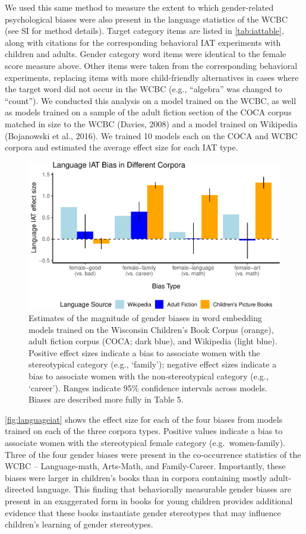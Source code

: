 \documentclass[english,,man,floatsintext]{apa6}
\begin{document}
We used this same method to measure the extent to which gender-related psychological biases were also present in the language statistics of the WCBC (see SI for method details). Target category items are listed in \autoref{tab:iattable}, along with citations for the corresponding behavioral IAT experiments with children and adults. Gender category word items were identical to the female score measure above. Other items were taken from the corresponding behavioral experiments, replacing items with more child-friendly alternatives in cases where the target word did not occur in the WCBC (e.g., \enquote{algebra} was changed to \enquote{count}). We conducted this analysis on a model trained on the WCBC, as well as models trained on a sample of the adult fiction section of the COCA corpus matched in size to the WCBC (Davies, 2008) and a model trained on Wikipedia (Bojanowski et al., 2016). We trained 10 models each on the COCA and WCBC corpora and estimated the average effect size for each IAT type.

\begin{figure}[t!]
\includegraphics[width=\textwidth,]{kidbookgender_files/figure-latex/languageiat-1} \caption{Estimates of the magnitude of gender biases in word embedding models trained on the Wisconsin Children’s Book Corpus (orange), adult fiction corpus (COCA; dark blue), and Wikipedia (light blue). Positive effect sizes indicate a bias to associate women with the stereotypical category (e.g., ‘family'); negative effect sizes indicate a bias to associate women with the non-stereotypical category (e.g., ‘career’).  Ranges indicate 95\% confidence intervals across models. Biases are described more fully in Table 5.}\label{fig:languageiat}
\end{figure}

\autoref{fig:languageiat} shows the effect size for each of the four biases from models trained on each of the three corpora types. Positive values indicate a bias to associate women with the stereotypical female category (e.g.~women-family). Three of the four gender biases were present in the co-occurrence statistics of the WCBC -- Language-math, Arts-Math, and Family-Career. Importantly, these biases were larger in children's books than in corpora containing mostly adult-directed language. This finding that behaviorally measurable gender biases are present in an exaggerated form in books for young children provides additional evidence that these books instantiate gender stereotypes that may influence children's learning of gender stereotypes.
\end{document}

